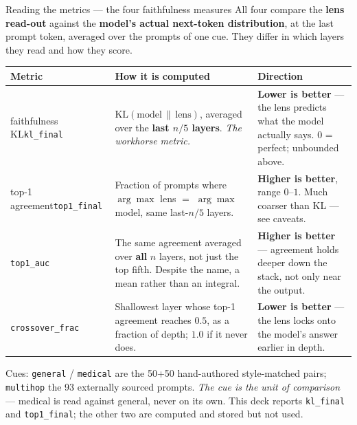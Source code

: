 \documentclass[aspectratio=169,10pt]{beamer}
\newcommand{\good}[1]{\textcolor{up}{#1}}
\begin{document}
\begin{frame}{Reading the metrics --- the four faithfulness measures}
  \footnotesize
  All four compare the \textbf{lens read-out} against the \textbf{model's actual
  next-token distribution}, at the last prompt token, averaged over the prompts
  of one cue. They differ in which layers they read and how they score.

  \vspace{0.5em}
  \begin{tabular}{@{}p{}p{}p{}@{}}
    \toprule
    Metric & How it is computed & Direction \\
    \midrule
    faithfulness KL\newline\texttt{kl\_final}
      & $\mathrm{KL}(\text{model}\,\|\,\text{lens})$, averaged over the
        \textbf{last $n/5$ layers}. \emph{The workhorse metric.}
      & \good{\textbf{Lower is better}} --- the lens predicts what the model
        actually says. $0$ = perfect; unbounded above. \\
    \addlinespace
    top-1 agreement\newline\texttt{top1\_final}
      & Fraction of prompts where $\arg\max$ lens $=$ $\arg\max$ model, same
        last-$n/5$ layers.
      & \good{\textbf{Higher is better}}, range $0$--$1$. Much coarser than KL
        --- see caveats. \\
    \addlinespace
    \texttt{top1\_auc}
      & The same agreement averaged over \textbf{all} $n$ layers, not just the
        top fifth. Despite the name, a mean rather than an integral.
      & \good{\textbf{Higher is better}} --- agreement holds deeper down the
        stack, not only near the output. \\
    \addlinespace
    \texttt{crossover\_frac}
      & Shallowest layer whose top-1 agreement reaches $0.5$, as a fraction of
        depth; $1.0$ if it never does.
      & \good{\textbf{Lower is better}} --- the lens locks onto the model's
        answer earlier in depth. \\
    \bottomrule
  \end{tabular}

  \vspace{0.5em}
  {\scriptsize Cues: \texttt{general} / \texttt{medical} are the 50+50
  hand-authored style-matched pairs; \texttt{multihop} the 93 externally sourced
  prompts. \emph{The cue is the unit of comparison} --- medical is read against
  general, never on its own. This deck reports \texttt{kl\_final} and
  \texttt{top1\_final}; the other two are computed and stored but not used.}
\end{frame}
\end{document}
